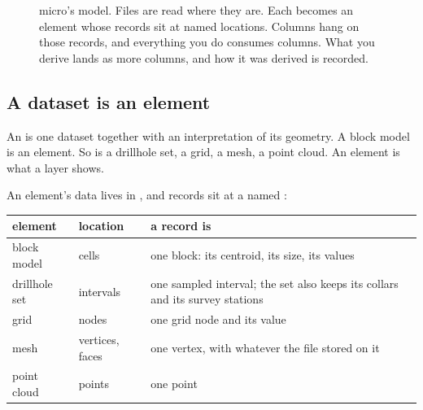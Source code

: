 \begin{figure}[htbp]
\caption{micro's model. Files are read where they are. Each becomes an element whose records sit at named locations. Columns hang on those records, and everything you do consumes columns. What you derive lands as more columns, and how it was derived is recorded.}\label{fig:micro-model}
\end{figure}

\subsection{A dataset is an element}\label{sec:micro-elements}
An  is one dataset together with an interpretation of its geometry. A block model is an element. So is a drillhole set, a grid, a mesh, a point cloud. An element is what a layer shows.

An element's data lives in , and records sit at a named :

\begin{tabularx}{\linewidth}{@{}llL@{}}\toprule
element & location & a record is \\ \midrule
block model & cells & one block: its centroid, its size, its values \\
drillhole set & intervals & one sampled interval; the set also keeps its collars and its survey stations \\
grid & nodes & one grid node and its value \\
mesh & vertices, faces & one vertex, with whatever the file stored on it \\
point cloud & points & one point \\
\bottomrule
\end{tabularx}

